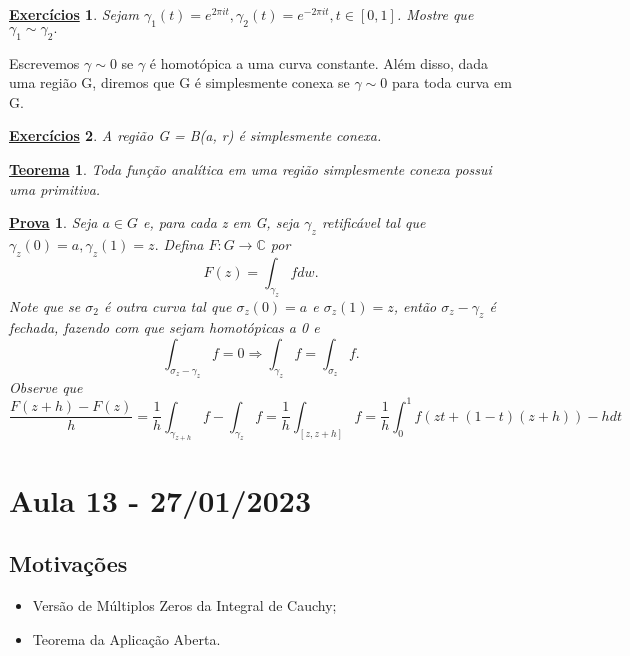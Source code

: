 \documentclass{article}
\newtheorem*{theorem*}{\underline{Teorema}}
\newtheorem*{proof*}{\underline{Prova}}
\newtheorem*{exer*}{\underline{Exerc\'icios}}
\begin{document}
\begin{exer*}
  Sejam $\gamma_{1}(t) = e^{2\pi it}, \gamma_{2}(t) = e^{-2\pi it}, t\in[0, 1]$. Mostre que $\gamma_{1}\sim \gamma_{2}.$
\end{exer*}
  Escrevemos $\gamma\sim0$ se $\gamma$ \'e homot\'opica a uma curva constante. Al\'em disso, dada uma regi\~ao G, diremos que
 G \'e simplesmente conexa se $\gamma\sim0$ para toda curva em G.
\begin{exer*}
  A regi\~ao G = B(a, r) \'e simplesmente conexa.
\end{exer*}
\begin{theorem*}
  Toda fun\c c\~ao anal\'itica em uma regi\~ao simplesmente conexa possui uma primitiva.
\end{theorem*}
\begin{proof*}
  Seja $a\in{G}$ e, para cada z em G, seja $\gamma_{z}$ retific\'avel tal que $\gamma_{z}(0) = a, \gamma_{z}(1) = z.$ Defina 
 $F:G\rightarrow \mathbb{C}$ por 
 $$
  F(z) = \int_{\gamma_{z}}^{}fdw.
 $$
 Note que se $\sigma_{2}$ \'e outra curva tal que $\sigma_{z}(0) = a$ e $\sigma_{z}(1) = z$, ent\~ao $\sigma_{z} - \gamma_{z}$
\'e fechada, fazendo com que sejam homot\'opicas a 0 e 
 $$
  \int_{\sigma_{z}-\gamma_{z}}^{}f = 0\Rightarrow \int_{\gamma_{z}}^{}f = \int_{\sigma_{z}}^{}f.
 $$
 Observe que 
 $$
 \frac{F(z+h) - F(z)}{h} = \frac{1}{h}\int_{\gamma_{z+h}}^{}f - \int_{\gamma_{z}}^{}f = \frac{1}{h}\int_{[z, z+h]}^{}f = \frac{1}{h}\int_{0}^{1}f(zt + (1-t)(z+h))-hdt
 $$
\end{proof*}
\newpage

\section{Aula 13 - 27/01/2023}
\subsection{Motiva\c c\~oes}
 \begin{itemize}
  \item Vers\~ao de M\'ultiplos Zeros da Integral de Cauchy;
  \item Teorema da Aplica\c c\~ao Aberta.
 \end{itemize}
 
\end{document}
